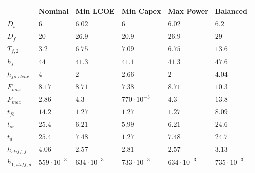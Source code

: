 \begin{tabular}{llllll}
& Nominal & Min LCOE & Min Capex & Max Power & Balanced\\ 
\hline 
$D_s$ & $6 $ & $6.02 $ & $6 $ & $6.02 $ & $6.2 $ \\ 
$D_f$ & $20 $ & $26.9 $ & $20.9 $ & $26.9 $ & $29 $ \\ 
$T_{f,2}$ & $3.2 $ & $6.75 $ & $7.09 $ & $6.75 $ & $13.6 $ \\ 
$h_s$ & $44 $ & $41.3 $ & $41.1 $ & $41.3 $ & $47.6 $ \\ 
$h_{fs,clear}$ & $4 $ & $2 $ & $2.66 $ & $2 $ & $4.04 $ \\ 
$F_{max}$ & $8.17 $ & $8.71 $ & $7.38 $ & $8.71 $ & $10.3 $ \\ 
$P_{max}$ & $2.86 $ & $4.3 $ & $770 \cdot 10^{-3}$ & $4.3 $ & $13.8 $ \\ 
$t_{fb}$ & $14.2 $ & $1.27 $ & $1.27 $ & $1.27 $ & $8.09 $ \\ 
$t_{sr}$ & $25.4 $ & $6.21 $ & $5.99 $ & $6.21 $ & $24.6 $ \\ 
$t_d$ & $25.4 $ & $7.48 $ & $1.27 $ & $7.48 $ & $24.7 $ \\ 
$h_{stiff,f}$ & $4.06 $ & $2.57 $ & $2.81 $ & $2.57 $ & $3.13 $ \\ 
$h_{1,stiff,d}$ & $559 \cdot 10^{-3}$ & $634 \cdot 10^{-3}$ & $733 \cdot 10^{-3}$ & $634 \cdot 10^{-3}$ & $735 \cdot 10^{-3}$ \\ 
\end{tabular}